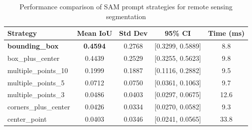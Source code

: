 \begin{table}[htbp]
\centering
\caption{Performance comparison of SAM prompt strategies for remote sensing segmentation}
\label{tab:results}
\begin{tabular}{@{}lcccc@{}}
\toprule
\textbf{Strategy} & \textbf{Mean IoU} & \textbf{Std Dev} & \textbf{95\% CI} & \textbf{Time (ms)} \\
\midrule
\textbf{bounding_box} & \textbf{0.4594} & 0.2768 & [0.3299, 0.5889] & 8.8 \\
box_plus_center & 0.4439 & 0.2529 & [0.3255, 0.5623] & 9.8 \\
multiple_points_10 & 0.1999 & 0.1887 & [0.1116, 0.2882] & 9.5 \\
multiple_points_5 & 0.0712 & 0.0750 & [0.0361, 0.1063] & 9.7 \\
multiple_points_3 & 0.0486 & 0.0403 & [0.0297, 0.0675] & 12.6 \\
corners_plus_center & 0.0426 & 0.0334 & [0.0270, 0.0582] & 9.3 \\
center_point & 0.0403 & 0.0346 & [0.0241, 0.0565] & 33.8 \\
\bottomrule
\end{tabular}
\end{table}